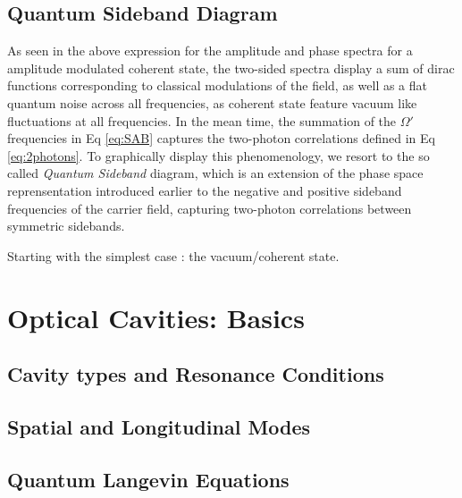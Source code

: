 \subsection{Quantum Sideband Diagram }
As seen in the above expression for the amplitude and phase spectra for a amplitude modulated coherent state, the two-sided spectra display a sum of dirac functions corresponding to classical modulations of the field, as well as a flat quantum noise across all frequencies, as coherent state feature vacuum like fluctuations at all frequencies. In the mean time, the summation of the $\Omega'$ frequencies in Eq \eqref{eq:SAB} captures the two-photon correlations defined in Eq \eqref{eq:2photons}. To graphically display this phenomenology, we resort to the so called \textit{Quantum Sideband} diagram, which is an extension of the phase space reprensentation introduced earlier to the negative and positive sideband frequencies of the carrier field, capturing two-photon correlations between symmetric sidebands.  

Starting with the simplest case : the vacuum/coherent state. 
\section{Optical Cavities: Basics}
\subsection{Cavity types and Resonance Conditions}
\subsection{Spatial and Longitudinal Modes}
\subsection{Quantum Langevin Equations}


